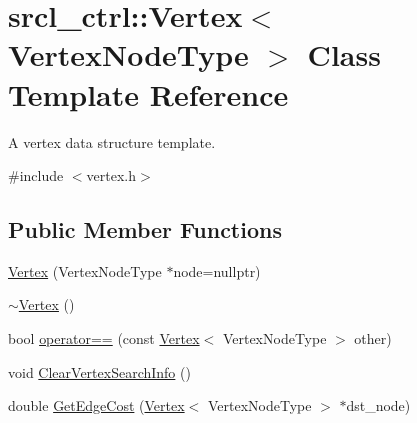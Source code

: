 \hypertarget{classsrcl__ctrl_1_1Vertex}{\section{srcl\-\_\-ctrl\-:\-:Vertex$<$ Vertex\-Node\-Type $>$ Class Template Reference}
\label{classsrcl__ctrl_1_1Vertex}
}


A vertex data structure template.  




{\ttfamily \#include $<$vertex.\-h$>$}

\subsection*{Public Member Functions}
\begin{DoxyCompactItemize}
\item 
\hyperlink{classsrcl__ctrl_1_1Vertex_af0578f23ded3d8439e87a3f2ae10292d}{Vertex} (Vertex\-Node\-Type $\ast$node=nullptr)
\item 
\hyperlink{classsrcl__ctrl_1_1Vertex_a0cb4745bc480b9efc8d0e502b16fbd52}{$\sim$\-Vertex} ()
\item 
bool \hyperlink{classsrcl__ctrl_1_1Vertex_a39000d2df49bb8bb1c69031cb643f4f8}{operator==} (const \hyperlink{classsrcl__ctrl_1_1Vertex}{Vertex}$<$ Vertex\-Node\-Type $>$ other)
\item 
void \hyperlink{classsrcl__ctrl_1_1Vertex_a0b523a10a2b6d3c6366351614212d6d7}{Clear\-Vertex\-Search\-Info} ()
\item 
double \hyperlink{classsrcl__ctrl_1_1Vertex_ad1bfb0c6db83570111f38239f253d705}{Get\-Edge\-Cost} (\hyperlink{classsrcl__ctrl_1_1Vertex}{Vertex}$<$ Vertex\-Node\-Type $>$ $\ast$dst\-\_\-node)
\end{DoxyCompactItemize}
